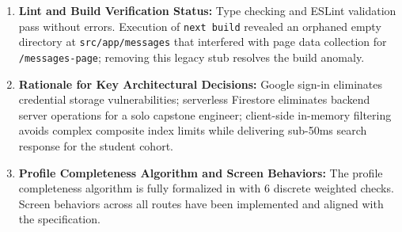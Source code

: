 \documentclass[11pt,letterpaper]{article}
\begin{document}
\begin{enumerate}[leftmargin=*,itemsep=4pt]
Confirmed. The security projection model is architected specifically around the separation of \texttt{users/\{uid\}} and \texttt{discoveryProfiles/}\allowbreak\texttt{\{uid\}}. Other collections (\texttt{projects}, \texttt{notifications}, \texttt{conversations}) enforce owner or participant checks directly within their respective document paths.
\item \textbf{Lint and Build Verification Status:}
Type checking and ESLint validation pass without errors. Execution of \texttt{next build} revealed an orphaned empty directory at \texttt{src/app/messages} that interfered with page data collection for \texttt{/messages-page}; removing this legacy stub resolves the build anomaly.
\item \textbf{Rationale for Key Architectural Decisions:}
Google sign-in eliminates credential storage vulnerabilities; serverless Firestore eliminates backend server operations for a solo capstone engineer; client-side in-memory filtering avoids complex composite index limits while delivering sub-50ms search response for the student cohort.
\item \textbf{Profile Completeness Algorithm and Screen Behaviors:}
The profile completeness algorithm is fully formalized in  with 6 discrete weighted checks. Screen behaviors across all routes have been implemented and aligned with the specification.
\end{enumerate}
\end{document}
